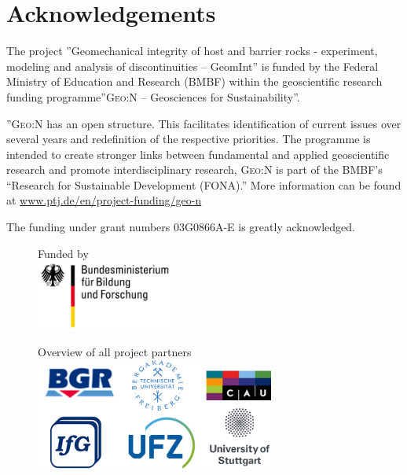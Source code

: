 %
%

\section*{Acknowledgements}
The project ''Geomechanical integrity of host and barrier rocks - experiment, modeling and analysis of discontinuities -- GeomInt'' is funded by the Federal Ministry of Education and Research (BMBF) within the geoscientific research funding programme''\textsc{Geo:N} – Geosciences for Sustainability''. 

''\textsc{Geo:N} has an open structure. This facilitates identification of current issues over several years and redefinition of the respective priorities. The programme is intended to create stronger links between fundamental and applied geoscientific research and promote interdisciplinary research, \textsc{Geo:N} is part of the BMBF's “Research for Sustainable Development (FONA).''
%
More information can be found at \url{www.ptj.de/en/project-funding/geo-n}

\bigskip
The funding under grant numbers 03G0866A-E is greatly acknowledged.

\begin{figure}[ht!]
\centering
Funded by \\[2mm]
\includegraphics[width=0.4\textwidth]{figures/bmbf.png}
\label{fig:BMBF_1}
\end{figure}

\vspace{1cm}

\begin{figure}[ht!]
\centering
Overview of all project partners \\[4mm]
\includegraphics[width=0.7\textwidth]{figures/partner.png}
\label{fig:logos_all}
\end{figure}
